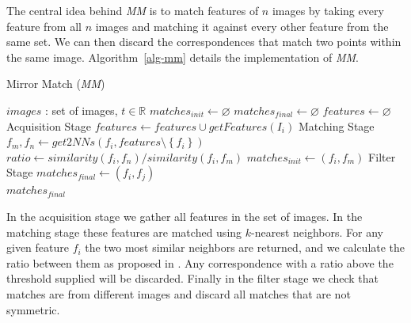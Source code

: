 \documentclass[conference]{IEEEtran}
\begin{document}
%
The central idea behind \emph{MM} is to match features of $n$ images by 
taking every feature from all $n$ images and matching it against every 
other feature from the same set. We can then discard the correspondences 
that match two points within the same image. Algorithm~\ref{alg-mm} details  
the implementation of \emph{MM}.
%
\begin{algorithm}
\caption{Mirror Match (\emph{MM})}
\label{alg-mm}
\begin{algorithmic}
\Require $images$ : set of images, $t \in \mathbb{R}$
\State $matches_{init}\gets \varnothing$
\State $matches_{final}\gets \varnothing$
\State $features\gets \varnothing$
 \Comment Acquisition Stage
	\State $features\gets features \cup getFeatures(I_i)$
\EndFor
{} \Comment Matching Stage
	\State $f_m,f_n \gets get2NNs(f_i, features \setminus 
	\left\{f_i\right\})$
	\State $ratio \gets similarity(f_i, f_n) / similarity(f_i, f_m)$
		\State $matches_{init} \gets \left(f_i, f_m\right)$
	\EndIf
\EndFor
{} \Comment Filter 
Stage
		\State $matches_{final} \gets (f_i, f_j)$
	\EndIf
\EndFor \\
\Return $matches_{final}$
\end{algorithmic}
\end{algorithm}
%
In the acquisition stage we gather all features in the set of images.  
In the matching stage these features are matched using $k$-nearest 
neighbors.  For any given feature $f_i$ the two most similar neighbors 
are returned, and we calculate the ratio between them as proposed in 
\cite{lowe2004sift}.  Any correspondence with a ratio above the 
threshold supplied will be discarded. Finally in the filter stage we 
check that matches are from different images and discard all matches 
that are not symmetric.
%
\end{document}
